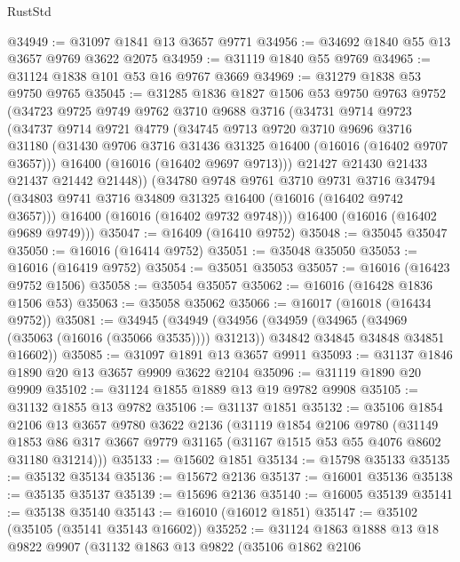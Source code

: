 \begin{lexlean}{RustStd}
\begin{coremodule}
@34949 := @31097 @1841 @13 @3657 @9771
@34956 := @34692 @1840 @55 @13 @3657 @9769 @3622 @2075
@34959 := @31119 @1840 @55 @9769
@34965 := @31124 @1838 @101 @53 @16 @9767 @3669
@34969 := @31279 @1838 @53 @9750 @9765
@35045 := @31285
    @1836
    @1827
    @1506
    @53
    @9750
    @9763
    @9752
    (@34723
      @9725
      @9749
      @9762
      @3710
      @9688
      @3716
      (@34731
        @9714
        @9723
        (@34737
          @9714
          @9721
          @4779
          (@34745
            @9713
            @9720
            @3710
            @9696
            @3716
            @31180
            (@31430 @9706 @3716 @31436 @31325 @16400 (@16016 (@16402 @9707 @3657)))
            @16400
            (@16016 (@16402 @9697 @9713)))
          @21427
          @21430
          @21433
          @21437
          @21442
          @21448))
      (@34780
        @9748
        @9761
        @3710
        @9731
        @3716
        @34794
        (@34803 @9741 @3716 @34809 @31325 @16400 (@16016 (@16402 @9742 @3657)))
        @16400
        (@16016 (@16402 @9732 @9748)))
      @16400
      (@16016 (@16402 @9689 @9749)))
@35047 := @16409 (@16410 @9752)
@35048 := @35045 @35047
@35050 := @16016 (@16414 @9752)
@35051 := @35048 @35050
@35053 := @16016 (@16419 @9752)
@35054 := @35051 @35053
@35057 := @16016 (@16423 @9752 @1506)
@35058 := @35054 @35057
@35062 := @16016 (@16428 @1836 @1506 @53)
@35063 := @35058 @35062
@35066 := @16017 (@16018 (@16434 @9752))
@35081 := @34945
    (@34949
      (@34956
        (@34959 (@34965 (@34969 (@35063 (@16016 (@35066 @3535)))) @31213))
        @34842
        @34845
        @34848
        @34851
        @16602))
@35085 := @31097 @1891 @13 @3657 @9911
@35093 := @31137 @1846 @1890 @20 @13 @3657 @9909 @3622 @2104
@35096 := @31119 @1890 @20 @9909
@35102 := @31124 @1855 @1889 @13 @19 @9782 @9908
@35105 := @31132 @1855 @13 @9782
@35106 := @31137 @1851
@35132 := @35106
    @1854
    @2106
    @13
    @3657
    @9780
    @3622
    @2136
    (@31119
      @1854
      @2106
      @9780
      (@31149 @1853 @86 @317 @3667 @9779 @31165 (@31167 @1515 @53 @55 @4076 @8602 @31180 @31214)))
@35133 := @15602 @1851
@35134 := @15798 @35133
@35135 := @35132 @35134
@35136 := @15672 @2136
@35137 := @16001 @35136
@35138 := @35135 @35137
@35139 := @15696 @2136
@35140 := @16005 @35139
@35141 := @35138 @35140
@35143 := @16010 (@16012 @1851)
@35147 := @35102 (@35105 (@35141 @35143 @16602))
@35252 := @31124
    @1863
    @1888
    @13
    @18
    @9822
    @9907
    (@31132
      @1863
      @13
      @9822
      (@35106
        @1862
        @2106

\end{coremodule}
\end{lexlean}
